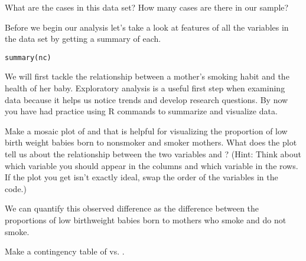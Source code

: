 \documentclass[11pt]{article}
\begin{document}
\begin{exercise}
What are the cases in this data set?  How many cases are there in our sample?
\end{exercise}

Before we begin our analysis let's take a look at features of all the variables in the data set by getting a summary of each.

\begin{lstlisting}
summary(nc)
\end{lstlisting}

We will first tackle the relationship between a mother's smoking habit and the health of her baby.  Exploratory analysis is a useful first step when examining data because it helps us notice trends and develop research questions.  By now you have had practice using R commands to summarize and visualize data.

\begin{exercise}
Make a mosaic plot of  and  that is helpful for visualizing the proportion of low birth weight babies born to nonsmoker and smoker mothers. What does the plot tell us about the relationship between the two variables  and ? (Hint: Think about which variable you should appear in the columns and which variable in the rows. If the plot you get isn't exactly ideal, swap the order of the variables in the code.) 
\end{exercise}

We can quantify this observed difference as the difference between the proportions of low birthweight babies born to mothers who smoke and do not smoke. 

\begin{exercise}
Make a contingency table of  vs. .
\end{exercise}

%
%
\end{document}
